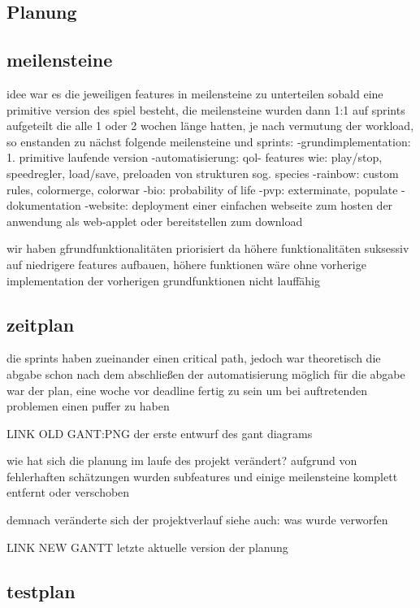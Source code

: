 \documentclass[12pt]{article}
\theoremstyle{plain}
\begin{document}
\begin{linenumbers}
\section{Planung}

\subsection{meilensteine}
idee war es die jeweiligen features in meilensteine zu unterteilen sobald eine primitive version des spiel besteht, die meilensteine wurden dann 1:1 auf sprints aufgeteilt die alle 1 oder 2 wochen länge hatten,
je nach vermutung der workload, so enstanden zu nächst folgende meilensteine und sprints:
-grundimplementation: 1. primitive laufende version
-automatisierung: qol- features wie: play/stop, speedregler, load/save, preloaden von strukturen sog. species
-rainbow: custom rules, colormerge, colorwar
-bio: probability of life
-pvp: exterminate, populate
-dokumentation
-website: deployment einer einfachen webseite zum hosten der anwendung als web-applet oder bereitstellen zum download

wir haben gfrundfunktionalitäten priorisiert da höhere funktionalitäten suksessiv auf niedrigere features aufbauen,
höhere funktionen wäre ohne vorherige implementation der vorherigen grundfunktionen nicht lauffähig

\subsection{zeitplan}
die sprints haben zueinander einen critical path, jedoch war theoretisch die abgabe schon nach dem abschließen der automatisierung möglich
für die abgabe war der plan, eine woche vor deadline fertig zu sein um bei auftretenden problemen einen puffer zu haben

LINK OLD GANT:PNG
der erste entwurf des gant diagrams

wie hat sich die planung im laufe des projekt verändert?
aufgrund von fehlerhaften schätzungen wurden subfeatures und einige meilensteine komplett entfernt oder verschoben

demnach veränderte sich der projektverlauf
siehe auch: was wurde verworfen


LINK NEW GANTT
letzte aktuelle version der planung

\subsection{testplan}


\end{linenumbers}
\end{document}
